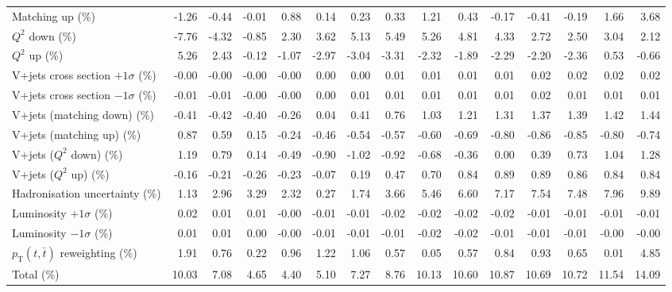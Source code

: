 \begin{table}[htbp]
{\begin{tabular}{lrrrrrrrrrrrrrr}
Matching up (\%) & -1.26 & -0.44 & -0.01 & 0.88 & 0.14 & 0.23 & 0.33 & 1.21 & 0.43 & -0.17 & -0.41 & -0.19 & 1.66 & 3.68 \\ 
$Q^{2}$ down (\%) & -7.76 & -4.32 & -0.85 & 2.30 & 3.62 & 5.13 & 5.49 & 5.26 & 4.81 & 4.33 & 2.72 & 2.50 & 3.04 & 2.12 \\ 
$Q^{2}$ up (\%) & 5.26 & 2.43 & -0.12 & -1.07 & -2.97 & -3.04 & -3.31 & -2.32 & -1.89 & -2.29 & -2.20 & -2.36 & 0.53 & -0.66 \\ 
V+jets cross section \ensuremath{+1\sigma} (\%) & -0.00 & -0.00 & -0.00 & -0.00 & 0.00 & 0.00 & 0.01 & 0.01 & 0.01 & 0.01 & 0.02 & 0.02 & 0.02 & 0.02 \\ 
V+jets cross section \ensuremath{-1\sigma} (\%) & -0.01 & -0.01 & -0.00 & -0.00 & 0.00 & 0.01 & 0.01 & 0.01 & 0.01 & 0.01 & 0.02 & 0.01 & 0.01 & 0.01 \\ 
V+jets (matching down) (\%) & -0.41 & -0.42 & -0.40 & -0.26 & 0.04 & 0.41 & 0.76 & 1.03 & 1.21 & 1.31 & 1.37 & 1.39 & 1.42 & 1.44 \\ 
V+jets (matching up) (\%) & 0.87 & 0.59 & 0.15 & -0.24 & -0.46 & -0.54 & -0.57 & -0.60 & -0.69 & -0.80 & -0.86 & -0.85 & -0.80 & -0.74 \\ 
V+jets ($Q^{2}$ down) (\%) & 1.19 & 0.79 & 0.14 & -0.49 & -0.90 & -1.02 & -0.92 & -0.68 & -0.36 & 0.00 & 0.39 & 0.73 & 1.04 & 1.28 \\ 
V+jets ($Q^{2}$ up) (\%) & -0.16 & -0.21 & -0.26 & -0.23 & -0.07 & 0.19 & 0.47 & 0.70 & 0.84 & 0.89 & 0.89 & 0.86 & 0.84 & 0.84 \\ 
Hadronisation uncertainty (\%) & 1.13 & 2.96 & 3.29 & 2.32 & 0.27 & 1.74 & 3.66 & 5.46 & 6.60 & 7.17 & 7.54 & 7.48 & 7.96 & 9.89 \\ 
Luminosity $+1\sigma$ (\%) & 0.02 & 0.01 & 0.01 & -0.00 & -0.01 & -0.01 & -0.02 & -0.02 & -0.02 & -0.02 & -0.01 & -0.01 & -0.01 & -0.01 \\ 
Luminosity $-1\sigma$ (\%) & 0.01 & 0.01 & 0.00 & -0.00 & -0.01 & -0.01 & -0.01 & -0.02 & -0.02 & -0.01 & -0.01 & -0.01 & -0.00 & -0.00 \\ 
$p_\mathrm{T}(t,\bar{t})$ reweighting (\%) & 1.91 & 0.76 & 0.22 & 0.96 & 1.22 & 1.06 & 0.57 & 0.05 & 0.57 & 0.84 & 0.93 & 0.65 & 0.01 & 4.85 \\ 
\hline 
Total (\%) & 10.03  & 7.08  & 4.65  & 4.40  & 5.10  & 7.27  & 8.76  & 10.13  & 10.60  & 10.87  & 10.69  & 10.72  & 11.54  & 14.09 \\ 
\hline 
\end{tabular}
}
\end{table}
